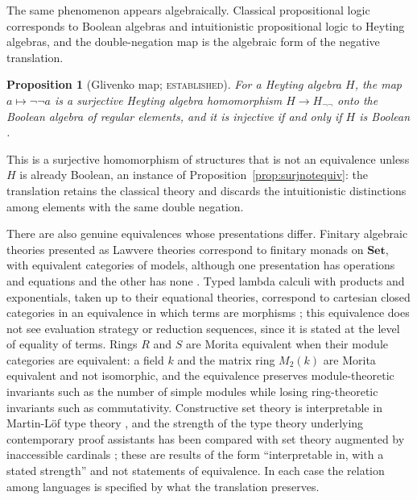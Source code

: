 \documentclass[11pt]{article}
\newtheorem{proposition}[theorem]{Proposition}
\theoremstyle{definition}
\theoremstyle{remark}
\newcommand{\stE}{\textsc{established}}
\newcommand{\Set}{\mathbf{Set}}
\begin{document}
The same phenomenon appears algebraically. Classical propositional logic corresponds to Boolean algebras and intuitionistic propositional logic to Heyting algebras, and the double-negation map is the algebraic form of the negative translation.

\begin{proposition}[Glivenko map; \stE]\label{prop:glivenko}
For a Heyting algebra $H$, the map $a\mapsto\neg\neg a$ is a surjective Heyting algebra homomorphism $H\to H_{\neg\neg}$ onto the Boolean algebra of regular elements, and it is injective if and only if $H$ is Boolean \cite{glivenko}.
\end{proposition}

This is a surjective homomorphism of structures that is not an equivalence unless $H$ is already Boolean, an instance of Proposition~\ref{prop:surjnotequiv}: the translation retains the classical theory and discards the intuitionistic distinctions among elements with the same double negation.

There are also genuine equivalences whose presentations differ. Finitary algebraic theories presented as Lawvere theories correspond to finitary monads on $\Set$, with equivalent categories of models, although one presentation has operations and equations and the other has none \cite{lawvere}. Typed lambda calculi with products and exponentials, taken up to their equational theories, correspond to cartesian closed categories in an equivalence in which terms are morphisms \cite{lambekscott}; this equivalence does not see evaluation strategy or reduction sequences, since it is stated at the level of equality of terms. Rings $R$ and $S$ are Morita equivalent when their module categories are equivalent: a field $k$ and the matrix ring $M_2(k)$ are Morita equivalent and not isomorphic, and the equivalence preserves module-theoretic invariants such as the number of simple modules while losing ring-theoretic invariants such as commutativity. Constructive set theory is interpretable in Martin-L\"of type theory \cite{aczel}, and the strength of the type theory underlying contemporary proof assistants has been compared with set theory augmented by inaccessible cardinals \cite{carneiro}; these are results of the form ``interpretable in, with a stated strength'' and not statements of equivalence. In each case the relation among languages is specified by what the translation preserves.
\end{document}
